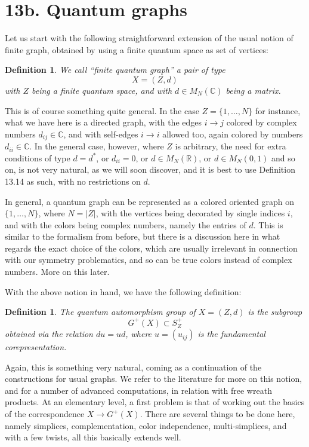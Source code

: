 \documentclass[12pt]{amsbook}
\newtheorem{definition}[theorem]{Definition}
\begin{document}
\section*{13b. Quantum graphs}

Let us start with the following straightforward extension of the usual notion of finite graph, obtained by using a finite quantum space as set of vertices:

\begin{definition}
We call ``finite quantum graph'' a pair of type
$$X=(Z,d)$$
with $Z$ being a finite quantum space, and with $d\in M_N(\mathbb C)$ being a matrix.
\end{definition}

This is of course something quite general. In the case $Z=\{1,\ldots,N\}$ for instance, what we have here is a directed graph, with the edges $i\to j$ colored by complex numbers $d_{ij}\in\mathbb C$, and with self-edges $i\to i$ allowed too, again colored by numbers $d_{ii}\in\mathbb C$. In the general case, however, where $Z$ is arbitrary, the need for extra conditions of type $d=d^*$, or $d_{ii}=0$, or $d\in M_N(\mathbb R)$, or $d\in M_N(0,1)$ and so on, is not very natural, as we will soon discover, and it is best to use Definition 13.14 as such, with no restrictions on $d$.

\bigskip

In general, a quantum graph can be represented as a colored oriented graph on $\{1,\ldots,N\}$, where $N=|Z|$, with the vertices being decorated by single indices $i$, and with the colors being complex numbers, namely the entries of $d$. This is similar to the formalism from before, but there is a discussion here in what regards the exact choice of the colors, which are usually irrelevant in connection with our symmetry problematics, and so can be true colors instead of complex numbers. More on this later.

\bigskip

With the above notion in hand, we have the following definition:

\begin{definition}
The quantum automorphism group of $X=(Z,d)$ is the subgroup 
$$G^+(X)\subset S_Z^+$$
obtained via the relation $du=ud$, where $u=(u_{ij})$ is the fundamental corepresentation.
\end{definition}

Again, this is something very natural, coming as a continuation of the constructions for usual graphs. We refer to the literature for more on this notion, and for a number of advanced computations, in relation with free wreath products. At an elementary level, a first problem is that of working out the basics of the correspondence $X\to G^+(X)$. There are several things to be done here, namely simplices, complementation, color independence, multi-simplices, and with a few twists, all this basically extends well. 
\end{document}
